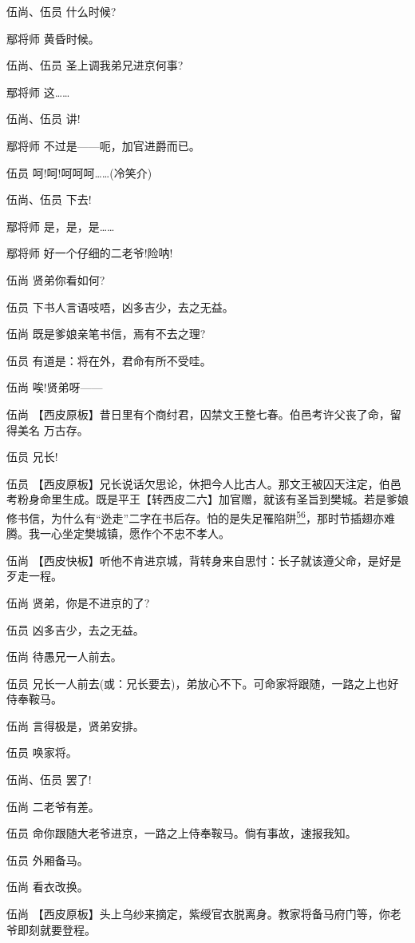 伍尚、伍员 什么时候?

鄢将师 黄昏时候。

伍尚、伍员 圣上调我弟兄进京何事?

鄢将师 这\ldots{}\ldots{}

伍尚、伍员 讲!

鄢将师 不过是------呃，加官进爵而已。

伍员 呵!呵!呵呵呵\ldots{}\ldots{}(冷笑介)

伍尚、伍员 下去!

鄢将师 是，是，是\ldots{}\ldots{}

鄢将师 好一个仔细的二老爷!险呐!

伍尚 贤弟你看如何?

伍员 下书人言语吱唔，凶多吉少，去之无益。

伍尚 既是爹娘亲笔书信，焉有不去之理?

伍员 有道是：将在外，君命有所不受哇。

伍尚 唉!贤弟呀------

伍尚
【西皮原板】昔日里有个商纣君，囚禁文王整七春。伯邑考许父丧了命，留得美名
万古存。

伍员 兄长!

伍员
【西皮原板】兄长说话欠思论，休把今人比古人。那文王被囚天注定，伯邑考粉身命里生成。既是平王【转西皮二六】加官赠，就该有圣旨到樊城。若是爹娘修书信，为什么有``迯走''二字在书后存。怕的是失足罹陷阱\protect\hyperlink{fn56}{\textsuperscript{56}}，那时节插翅亦难腾。我一心坐定樊城镇，愿作个不忠不孝人。

伍尚
【西皮快板】听他不肯进京城，背转身来自思忖：长子就该遵父命，是好是歹走一程。

伍尚 贤弟，你是不进京的了?

伍员 凶多吉少，去之无益。

伍尚 待愚兄一人前去。

伍员
兄长一人前去(或：兄长要去)，弟放心不下。可命家将跟随，一路之上也好侍奉鞍马。

伍尚 言得极是，贤弟安排。

伍员 唤家将。

伍尚、伍员 罢了!

伍尚 二老爷有差。

伍员 命你跟随大老爷进京，一路之上侍奉鞍马。倘有事故，速报我知。

伍员 外厢备马。

伍尚 看衣改换。

伍尚
【西皮原板】头上乌纱来摘定，紫绶官衣脱离身。教家将备马府门等，你老爷即刻就要登程。

